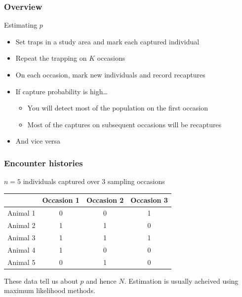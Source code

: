 \documentclass[color=usenames,dvipsnames]{beamer}\usepackage[]{graphicx}\usepackage[]{xcolor}
\begin{document}
\begin{frame}
  \frametitle{Overview}
  \large
  {%
    Estimating $p$}
  \begin{itemize}[<+->]
    \normalsize
    \item Set traps in a study area and mark each captured individual
    \item Repeat the trapping on $K$ occasions
    \item On each occasion, mark new individuals and record recaptures
    \item If capture probability is high\dots
    \begin{itemize}
      \normalsize
      \item You will detect most of the population on the first
        occasion
      \item Most of the captures on subsequent occasions will be
        recaptures
    \end{itemize}
    \item And vice versa
  \end{itemize}
\end{frame}






\begin{frame}
  \frametitle{Encounter histories}
  {\centering \large $n=5$ individuals captured over 3 sampling occasions \par}
  \vspace{0.3cm}
  \begin{center}
    \small
    \begin{tabular}{lccc}
      \hline
      & Occasion 1 & Occasion 2 & Occasion 3 \\
      \hline
      Animal 1 & 0 & 0 & 1 \\
      Animal 2 & 1 & 1 & 0 \\
      Animal 3 & 1 & 1 & 1 \\
      Animal 4 & 1 & 0 & 0 \\
      Animal 5 & 0 & 1 & 0 \\
      \hline
    \end{tabular}
  \end{center}
  \pause
  \vfill
  \centering
  \large These data tell us about $p$ and hence $N$. Estimation is
  usually acheived using maximum likelihood methods.
\end{frame}
\end{document}
